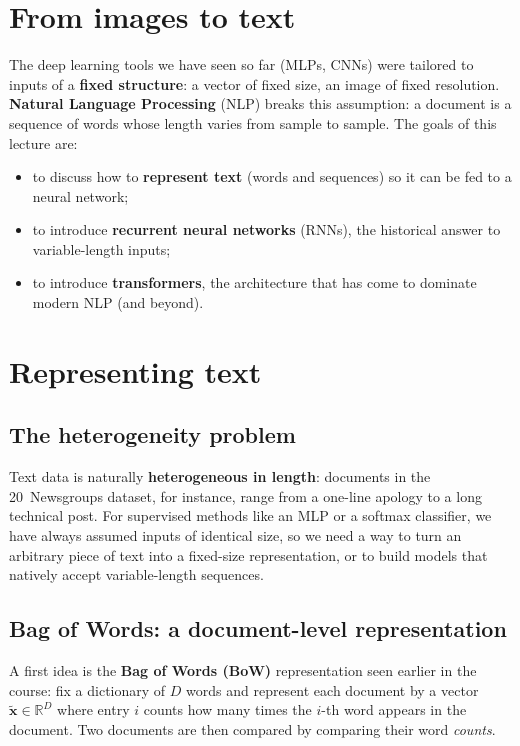
\section{From images to text}
The deep learning tools we have seen so far (MLPs, CNNs) were tailored to inputs of a
\textbf{fixed structure}: a vector of fixed size, an image of fixed resolution. \textbf{Natural
Language Processing} (NLP) breaks this assumption: a document is a sequence of words whose
length varies from sample to sample. The goals of this lecture are:
\begin{itemize}
  \item to discuss how to \textbf{represent text} (words and sequences) so it can be fed to a neural network;
  \item to introduce \textbf{recurrent neural networks} (RNNs), the historical answer to variable-length inputs;
  \item to introduce \textbf{transformers}, the architecture that has come to dominate modern NLP (and beyond).
\end{itemize}

\section{Representing text}
\subsection{The heterogeneity problem}
Text data is naturally \textbf{heterogeneous in length}: documents in the 20~Newsgroups
dataset, for instance, range from a one-line apology to a long technical post. For supervised
methods like an MLP or a softmax classifier, we have always assumed inputs of identical size,
so we need a way to turn an arbitrary piece of text into a fixed-size representation, or to
build models that natively accept variable-length sequences.

\subsection{Bag of Words: a document-level representation}
A first idea is the \textbf{Bag of Words (BoW)} representation seen earlier in the course:
fix a dictionary of $D$ words and represent each document by a vector
$\tilde{\mathbf{x}} \in \mathbb{R}^{D}$ where entry $i$ counts how many times the $i$-th word
appears in the document. Two documents are then compared by comparing their word
\emph{counts}.

